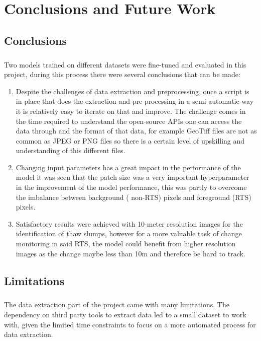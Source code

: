 \chapter{Conclusions and Future Work}
\section{Conclusions}
\paragraph{}
Two models trained on different datasets were fine-tuned and evaluated in this project, during this process there were several conclusions that can be made:
\begin{enumerate}
    \item{Despite the challenges of data extraction and preprocessing, once a script is in place that does the extraction and pre-processing in a semi-automatic way it is relatively easy to iterate on that and improve. The challenge comes in the time required to understand the open-source APIs one can access the data through and the format of that data, for example GeoTiff files are not as common as JPEG or PNG files so there is a certain level of upskilling and understanding of this different files.}
    
    \item{Changing input parameters has a great impact in the performance of the model it was seen that the patch size was a very important hyperparameter in the improvement of the model performance, this was partly to overcome the imbalance between background ( non-RTS) pixels and foreground (RTS) pixels.}
    
    \item{Satisfactory results were achieved with 10-meter resolution images for the identification of thaw slumps, however for a more valuable task of change monitoring in said RTS, the model could benefit from higher resolution images as the change maybe less than 10m and therefore be hard to track.}
\end{enumerate}

\section{Limitations}
\paragraph{}
The data extraction part of the project came with many limitations. The dependency on third party tools to extract data led to a small dataset to work with, given the limited time constraints to focus on a more automated process for data extraction.

